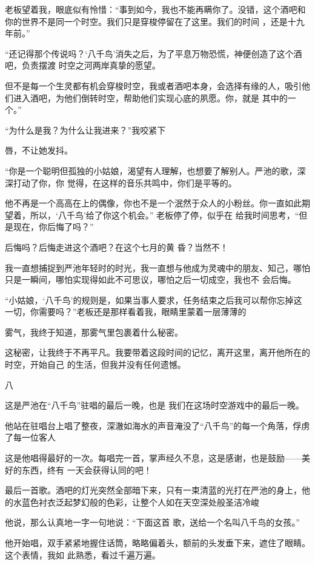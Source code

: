 \documentclass{article}
\begin{document}
老板望着我，眼底似有怜惜：“事到如今，我也不能再瞒你了。没错，这个酒吧和你的世界不是同一个时空。我们只是穿梭停留在了这里。我们的时间
，还是十九年前。” 

“还记得那个传说吗？‘八千鸟’消失之后，为了平息万物恐慌，神便创造了这个酒吧，负责摆渡
时空之河两岸真挚的愿望。 

但不是每一个生灵都有机会穿梭时空，我或者酒吧本身，会选择有缘的人，吸引他们进入酒吧，为他们倒转时空，帮助他们实现心底的夙愿。你，就是
其中的一个。” 

“为什么是我？为什么让我进来？”我咬紧下

\newpage
唇，不让她发抖。 

“你是一个聪明但孤独的小姑娘，渴望有人理解，也想要了解别人。严池的歌，深深打动了你，你
觉得，在这样的音乐共鸣中，你们是平等的。 

他不再是一个高高在上的偶像，你也不是一个泯然于众人的小粉丝。你一直如此期望着，所以，‘八千鸟’给了你这个机会。” 老板停了停，似乎在
给我时间思考，“但是现在，你后悔了吗？” 

后悔吗？后悔走进这个酒吧？在这个七月的黄
昏？当然不！ 

我一直想捕捉到严池年轻时的时光，我一直想与他成为灵魂中的朋友、知己，哪怕只是一瞬间，哪怕实现得如此不可思议，哪怕之后一切成空，我也不
会后悔。 

“小姑娘，‘八千鸟’的规则是，如果当事人要求，任务结束之后我可以帮你忘掉这一切，你需要吗？”老板还是那样看着我，眼睛里蒙着一层薄薄的
\newpage

雾气，我终于知道，那雾气里包裹着什么秘密。 

这秘密，让我终于不再平凡。我要带着这段时间的记忆，离开这里，离开他所在的时空，开始自己
的生活，但我并没有任何遗憾。 


八 

这是严池在“八千鸟”驻唱的最后一晚，也是
我们在这场时空游戏中的最后一晚。 

他站在驻唱台上唱了整夜，深澈如海水的声音淹没了“八千鸟”的每一个角落，俘虏了每一位客人

这是他唱得最好的一次。每唱完一首，掌声经久不息，这是感谢，也是鼓励——美好的东西，终有
一天会获得认同的吧！ 

最后一首歌。酒吧的灯光突然全部暗下来，只有一束清蓝的光打在严池的身上，他的水蓝色衬衣泛起梦幻般的色彩，让整个人如在天空深处般圣洁冷峻
\newpage


他说，那么认真地一字一句地说：“下面这首
歌，送给一个名叫八千鸟的女孩。” 

他开始唱，双手紧紧地握住话筒，略略偏着头，额前的头发垂下来，遮住了眼睛。这个表情，我如
此熟悉，看过千遍万遍。 
\end{document}
